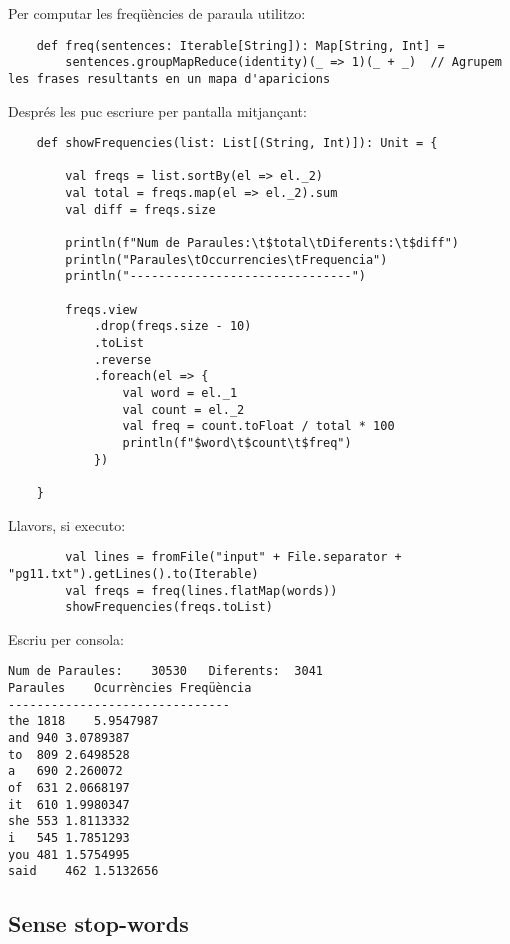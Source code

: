 \documentclass{article}
\begin{document}
Per computar les freqüències de paraula utilitzo:

\begin{lstlisting}
    def freq(sentences: Iterable[String]): Map[String, Int] =
        sentences.groupMapReduce(identity)(_ => 1)(_ + _)  // Agrupem les frases resultants en un mapa d'aparicions
\end{lstlisting}

Després les puc escriure per pantalla mitjançant:

\begin{lstlisting}
    def showFrequencies(list: List[(String, Int)]): Unit = {

        val freqs = list.sortBy(el => el._2)
        val total = freqs.map(el => el._2).sum
        val diff = freqs.size

        println(f"Num de Paraules:\t$total\tDiferents:\t$diff")
        println("Paraules\tOccurrencies\tFrequencia")
        println("-------------------------------")

        freqs.view
            .drop(freqs.size - 10)
            .toList
            .reverse
            .foreach(el => {
                val word = el._1
                val count = el._2
                val freq = count.toFloat / total * 100
                println(f"$word\t$count\t$freq")
            })

    }
\end{lstlisting}

Llavors, si executo:

\begin{lstlisting}
        val lines = fromFile("input" + File.separator + "pg11.txt").getLines().to(Iterable)
        val freqs = freq(lines.flatMap(words))
        showFrequencies(freqs.toList)
\end{lstlisting}

Escriu per consola:

\begin{verbatim}
Num de Paraules:	30530	Diferents:	3041
Paraules	Ocurrències	Freqüència
-------------------------------
the	1818	5.9547987
and	940	3.0789387
to	809	2.6498528
a	690	2.260072
of	631	2.0668197
it	610	1.9980347
she	553	1.8113332
i	545	1.7851293
you	481	1.5754995
said	462	1.5132656
\end{verbatim}

\subsection{Sense stop-words}
\end{document}
